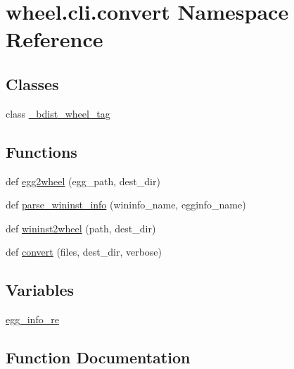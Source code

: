 \hypertarget{namespacewheel_1_1cli_1_1convert}{}\section{wheel.\+cli.\+convert Namespace Reference}
\label{namespacewheel_1_1cli_1_1convert}
\subsection*{Classes}
\begin{DoxyCompactItemize}
\item 
class \hyperlink{classwheel_1_1cli_1_1convert_1_1__bdist__wheel__tag}{\+\_\+bdist\+\_\+wheel\+\_\+tag}
\end{DoxyCompactItemize}
\subsection*{Functions}
\begin{DoxyCompactItemize}
\item 
def \hyperlink{namespacewheel_1_1cli_1_1convert_a83b8a22a02b8e4ffdf7ee67cfb897d6b}{egg2wheel} (egg\+\_\+path, dest\+\_\+dir)
\item 
def \hyperlink{namespacewheel_1_1cli_1_1convert_af3abb35083c36470841fbac93fc8f19f}{parse\+\_\+wininst\+\_\+info} (wininfo\+\_\+name, egginfo\+\_\+name)
\item 
def \hyperlink{namespacewheel_1_1cli_1_1convert_a1f06b050e440ed22143d63e25e295559}{wininst2wheel} (path, dest\+\_\+dir)
\item 
def \hyperlink{namespacewheel_1_1cli_1_1convert_af3bc802d1311c120a48e97d90de58fde}{convert} (files, dest\+\_\+dir, verbose)
\end{DoxyCompactItemize}
\subsection*{Variables}
\begin{DoxyCompactItemize}
\item 
\hyperlink{namespacewheel_1_1cli_1_1convert_a3b230507fc4be0a22f526158aa5153ea}{egg\+\_\+info\+\_\+re}
\end{DoxyCompactItemize}


\subsection{Function Documentation}
\mbox{\label{namespacewheel_1_1cli_1_1convert_af3bc802d1311c120a48e97d90de58fde}} 
